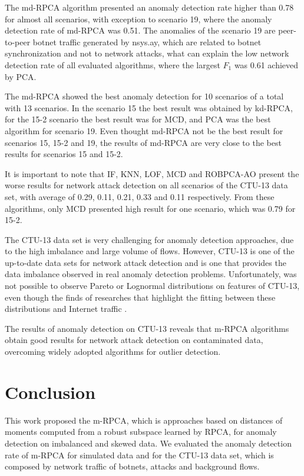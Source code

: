 The md-RPCA algorithm presented an anomaly detection rate higher than 0.78 for almost all scenarios, with exception to scenario 19, where the anomaly detection rate of md-RPCA was 0.51. The anomalies of the scenario 19 are peer-to-peer botnet traffic generated by nsys.ay, which are related to botnet synchronization and not to network attacks, what can explain the low network detection rate of all evaluated algorithms, where the largest $F_1$ was 0.61 achieved by PCA.

The md-RPCA showed the best anomaly detection for 10 scenarios of a total with 13 scenarios. In the scenario 15 the best result was obtained by kd-RPCA, for the 15-2 scenario the best result was for MCD, and PCA was the best algorithm for scenario 19. Even thought md-RPCA not be the best result for scenarios 15, 15-2 and 19, the results of md-RPCA are very close to the best results for scenarios 15 and 15-2.

It is important to note that IF, KNN, LOF, MCD and ROBPCA-AO present the worse results for network attack detection on all scenarios of the CTU-13 data set, with average of 0.29, 0.11, 0.21, 0.33 and 0.11 respectively. From these algorithms, only MCD presented high result for one scenario, which was 0.79 for 15-2.

The CTU-13 data set is very challenging for anomaly detection approaches, due to the high imbalance and large volume of flows. However, CTU-13 is one of the up-to-date data sets for network attack detection and is one that provides the data imbalance observed in real anomaly detection problems. Unfortunately, was not possible to observe Pareto or Lognormal distributions on features of CTU-13, even though the finds of researches that highlight the fitting between these distributions and Internet traffic \cite{benson2010network, leon2017probability}. 

The results of anomaly detection on CTU-13 reveals that m-RPCA algorithms obtain good results for network attack detection on contaminated data, overcoming widely adopted algorithms for outlier detection.


\section{Conclusion}
\label{sec:4_conclusion}

This work proposed the m-RPCA, which is approaches based on distances of moments computed from a robust subspace learned by RPCA, for anomaly detection on imbalanced and skewed data. We evaluated the anomaly detection rate of m-RPCA for simulated data and for the CTU-13 data set, which is composed by network traffic of botnets, attacks and background flows.

